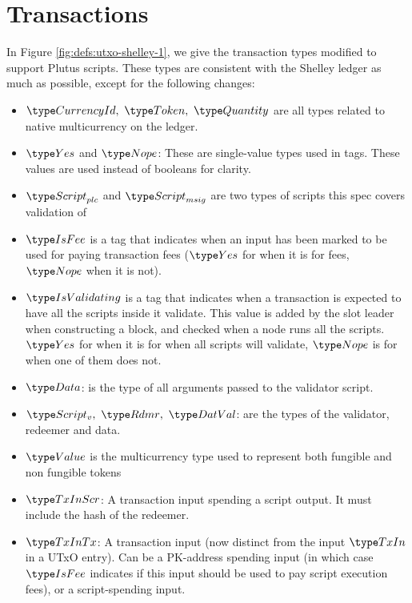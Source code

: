 \section{Transactions}
\label{sec:transactions}

In Figure \ref{fig:defs:utxo-shelley-1}, we give the transaction types modified
to support Plutus scripts. These types are consistent with the Shelley ledger
as much as possible,
except for the following changes:

\begin{itemize}
  \item $\CurrencyId,~\Token,~\Quantity$ are all types
  related to native multicurrency on the ledger.

  \item $\Yes$ and $\Nope$: These are single-value types used in tags. These
  values are used instead of booleans for clarity.

  \item $\ScriptPlutus$ and $\ScriptMSig$ are two types of scripts this spec
  covers validation of

  \item $\IsFee$ is a tag that indicates when an input has been marked
  to be used for paying transaction fees ($\Yes$ for when it is for fees,
  $\Nope$ when it is not).

  \item $\IsValidating$ is a tag that indicates when a transaction is
  expected to have all the scripts inside it validate.
  This value is added by the slot leader when
  constructing a block, and checked when a node runs all the scripts.
  $\Yes$ for when it is for when all scripts will validate,
  $\Nope$ is for when one of them does not.

  \item $\Data$: is the type of all arguments passed to the validator script.

  \item $\ScriptV,~ \Rdmr,~ \DatVal$: are the types of the validator,
  redeemer and data.

  \item $\Value$ is the multicurrency type used to represent
  both fungible and non fungible tokens

  \item $\TxInScr$: A transaction input spending a script output. It must
  include the hash of the redeemer.

  \item $\TxInTx$: A transaction input (now distinct from the input $\TxIn$ in
  a UTxO entry). Can be a PK-address spending input
  (in which case $\IsFee$ indicates if this input should be used to pay script execution
  fees), or a script-spending input.


\end{itemize}
